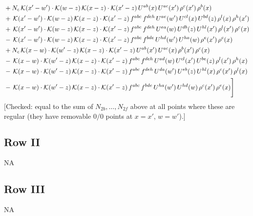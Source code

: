 \documentclass[9pt]{article}
\numberwithin{equation}{section}
\begin{document}
\begin{align}
&+N_{c}\,\mathcal{K}(x'-w')\cdot\mathcal{K}(w-z)\,\mathcal{K}(x-z)\cdot\mathcal{K}(x'-z)\,U^{ab}(x)\,U^{ac}(x')\,\rho^{c}(x')\,\rho^{b}(x)\notag \\ 
&+\,\mathcal{K}(x'-w')\cdot\mathcal{K}(w-z)\,\mathcal{K}(x-z)\cdot\mathcal{K}(x'-z)\,f^{abc}\,f^{deh}\,U^{ae}(w')\,U^{cl}(x)\,U^{bd}(z)\,\rho^{l}(x)\,\rho^{h}(x')\notag \\ 
&+\,\mathcal{K}(x'-w')\cdot\mathcal{K}(w-z)\,\mathcal{K}(x-z)\cdot\mathcal{K}(x'-z)\,f^{abc}\,f^{deh}\,U^{ea}(w)\,U^{db}(z)\,U^{hl}(x')\,\rho^{l}(x')\,\rho^{c}(x)\notag \\ 
&-\,\mathcal{K}(x'-w')\cdot\mathcal{K}(w-z)\,\mathcal{K}(x-z)\cdot\mathcal{K}(x'-z)\,f^{abc}\,f^{bde}\,U^{hd}(w')\,U^{ha}(w)\,\rho^{e}(x')\,\rho^{c}(x)\notag \\ 
&+N_{c}\,\mathcal{K}(x-w)\cdot\mathcal{K}(w'-z)\,\mathcal{K}(x-z)\cdot\mathcal{K}(x'-z)\,U^{ab}(x')\,U^{ac}(x)\,\rho^{b}(x')\,\rho^{c}(x)\notag \\ 
&-\,\mathcal{K}(x-w)\cdot\mathcal{K}(w'-z)\,\mathcal{K}(x-z)\cdot\mathcal{K}(x'-z)\,f^{abc}\,f^{deh}\,U^{ad}(w)\,U^{cl}(x')\,U^{be}(z)\,\rho^{l}(x')\,\rho^{h}(x)\notag \\ 
&-\,\mathcal{K}(x-w)\cdot\mathcal{K}(w'-z)\,\mathcal{K}(x-z)\cdot\mathcal{K}(x'-z)\,f^{abc}\,f^{deh}\,U^{da}(w')\,U^{eb}(z)\,U^{hl}(x)\,\rho^{c}(x')\,\rho^{l}(x)\notag \\ 
&-\,\mathcal{K}(x-w)\cdot\mathcal{K}(w'-z)\,\mathcal{K}(x-z)\cdot\mathcal{K}(x'-z)\,f^{abc}\,f^{bde}\,U^{ha}(w')\,U^{hd}(w)\,\rho^{c}(x')\,\rho^{e}(x)\Bigg]
\end{align} {\color{red}[Checked: equal to the sum of $N_{2b},\dots,N_{2f}$ above at all points where these are regular (they have removable $0/0$ points at $x=x'$, $w=w'$).]}\par\noindent 

\subsection{Row II}
\textsc{NA}
\subsection{Row III}
\textsc{NA}
\end{document}
